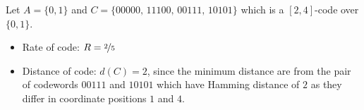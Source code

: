 \begin{exbox}
    \begin{example}
        Let $ A=\{0,1\} $ and $ C=\{00000,\,11100,\,00111,\,10101\} $ which is a
        $ [2,4] $-code over $ \{0,1\} $.
        \begin{itemize}
            \item Rate of code: $ R=\nicefrac{2}{5} $
            \item Distance of code: $ d(C)=2 $, since the minimum distance
            are from the pair of codewords $ 00111 $ and $ 10101 $ which
            have Hamming distance of $ 2 $ as they differ in coordinate
            positions $ 1 $ and $ 4 $.
        \end{itemize}
    \end{example}
\end{exbox}